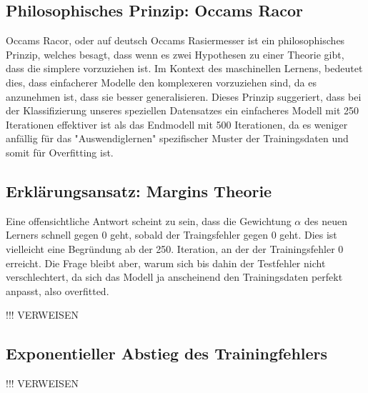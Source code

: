 \subsection{Philosophisches Prinzip: Occams Racor}
Occams Racor, oder auf deutsch Occams Rasiermesser ist ein philosophisches Prinzip, welches besagt, dass wenn es zwei Hypothesen zu einer Theorie gibt, dass die simplere vorzuziehen ist. Im Kontext des maschinellen Lernens, bedeutet dies, dass einfacherer Modelle den komplexeren vorzuziehen sind, da es anzunehmen ist, dass sie besser generalisieren. Dieses Prinzip suggeriert, dass bei der Klassifizierung unseres speziellen Datensatzes ein einfacheres Modell mit 250 Iterationen effektiver ist als das Endmodell mit 500 Iterationen, da es weniger anfällig für das "Auswendiglernen" spezifischer Muster der Trainingsdaten und somit für Overfitting ist.

\subsection{Erklärungsansatz: Margins Theorie}
Eine offensichtliche Antwort scheint zu sein, dass die Gewichtung \( \alpha \) des neuen Lerners schnell gegen 0 geht, sobald der Traingsfehler gegen 0 geht. Dies ist vielleicht eine Begründung ab der 250. Iteration, an der der Trainingsfehler 0 erreicht. Die Frage bleibt aber, warum sich bis dahin der Testfehler nicht verschlechtert, da sich das Modell ja anscheinend den Trainingsdaten perfekt anpasst, also overfitted.




!!! VERWEISEN

\subsection{Exponentieller Abstieg des Trainingfehlers}
!!! VERWEISEN
